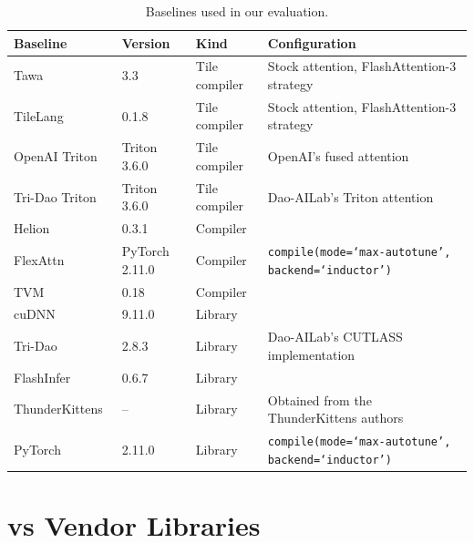 \begin{table}[h]
  \small
  \centering
  \caption{Baselines used in our evaluation.}
  \label{tab:baselines}
  \begin{tabular}{llll}
    \toprule
    \textbf{Baseline} & \textbf{Version} & \textbf{Kind} & \textbf{Configuration} \\
    \midrule
    Tawa~\cite{tawa}                    & 3.3            & Tile compiler & Stock attention, FlashAttention-3 strategy \\
    TileLang~\cite{tilelang}            & 0.1.8          & Tile compiler & Stock attention, FlashAttention-3 strategy \\
    OpenAI Triton~\cite{openai-fused-attn} & Triton 3.6.0 & Tile compiler & OpenAI's fused attention \\
    Tri-Dao Triton~\cite{flash-attn-repo}  & Triton 3.6.0 & Tile compiler & Dao-AILab's Triton attention \\
    Helion                              & 0.3.1          & Compiler      & \\
    FlexAttn                            & PyTorch 2.11.0 & Compiler      & \texttt{compile(mode=`max-autotune', backend=`inductor')} \\
    TVM~\cite{tvm}                      & 0.18           & Compiler      & \\
    \midrule
    cuDNN                               & 9.11.0         & Library       & \\
    Tri-Dao~\cite{flash-attn-repo}      & 2.8.3          & Library       & Dao-AILab's CUTLASS implementation \\
    FlashInfer~\cite{flashinfer}        & 0.6.7          & Library       & \\
    ThunderKittens~\cite{thunderkittens} & --            & Library       & Obtained from the ThunderKittens authors \\
    PyTorch~\cite{pytorch}              & 2.11.0         & Library       & \texttt{compile(mode=`max-autotune', backend=`inductor')} \\
    \bottomrule
  \end{tabular}
\end{table}

\clearpage

\section{\NAME{} vs Vendor Libraries}
\label{sec:vendor-libs}

